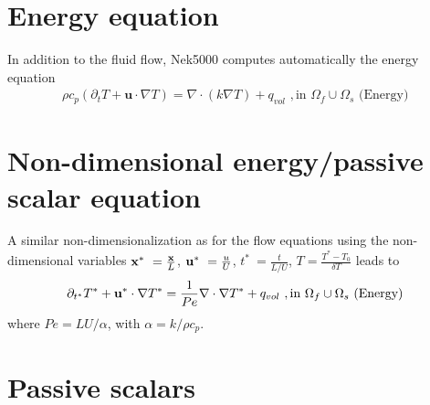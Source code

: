 
\section{Energy equation}
In addition to the fluid flow, Nek5000 computes automatically the energy equation
\begin{eqnarray}\label{eq:energy}
 \rho c_{p} ( \partial_{t} T + \mathbf u \cdot \nabla T ) =
   \nabla \cdot (k \nabla T) + q_{vol}\,\, ,\text{in } \Omega_f\cup \Omega_s  \text{  (Energy)  } 
\end{eqnarray}

\section{Non-dimensional energy/passive scalar equation}
A similar non-dimensionalization as for the flow equations using the non-dimensional variables
\(\mathbf{x}^*\ = \frac{\mathbf{x}}{L}\),  \(\mathbf{u}^*\ = \frac{u}{U}\), \(t^*\ = \frac{t}{L/U}\), \(T=\frac{T^*-T_0}{\delta T}\) leads to
\begin{eqnarray}\label{eq:energy_nondim}
\partial_{t^*} T^* + \mathbf{u}^* \cdot \nabla T^* =
  \frac{1}{Pe} \nabla \cdot \nabla T^* + q_{vol}\,\, ,\text{in } \Omega_f\cup \Omega_s  \text{  (Energy)  } 
\end{eqnarray}
where \(Pe=LU/\alpha\), with \(\alpha=k/\rho c_p\).


\section{Passive scalars}\label{sec:passive_scal}


